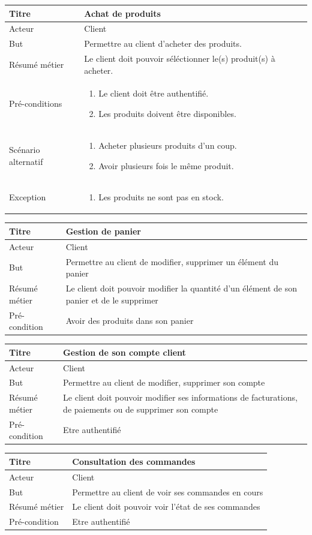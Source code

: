 \documentclass[12pt]{article}
\newcommand\addrow[2]{#1 &#2\\ }
\newcommand\addheading[2]{\textbf{#1} &#2\\ \hline}
\newcommand\tabularhead{\begin{tabular}{lp{11cm}}
\hline
}
\newcommand\addmulrow[2]{ \begin{minipage}[t][][t]{3.5cm}#1\end{minipage}%
    &\begin{minipage}[t][][t]{11cm}
    \begin{enumerate} #2   \end{enumerate}
    \end{minipage}\\ }
\newenvironment{usecase}{\tabularhead}
{\hline\end{tabular}}
\begin{document}
\begin{usecase}
    \addheading{Titre}{Achat de produits}
    \addrow{Acteur}{Client}
    \addrow{But}{Permettre au client d'acheter des produits.}
    \addrow{Résumé métier}{Le client doit pouvoir séléctionner le(s) produit(s) à acheter.}
    \addmulrow{Pré-conditions}{
    \item Le client doit être authentifié.
    \item Les produits doivent être disponibles.
    }
    \addmulrow{Scénario alternatif}{
    \item Acheter plusieurs produits d'un coup.
    \item Avoir plusieurs fois le même produit.
    }
    \addmulrow{Exception}{
    \item Les produits ne sont pas en stock.
    }
\end{usecase}

\begin{usecase}
    \addheading{Titre}{Gestion de panier}
    \addrow{Acteur}{Client}
    \addrow{But}{Permettre au client de modifier, supprimer un élément du panier}
    \addrow{Résumé métier}{Le client doit pouvoir modifier la quantité d'un élément de son panier et de le supprimer}
    \addrow{Pré-condition}{Avoir des produits dans son panier}
\end{usecase}

\begin{usecase}
    \addheading{Titre}{Gestion de son compte client}
    \addrow{Acteur}{Client}
    \addrow{But}{Permettre au client de modifier, supprimer son compte}
    \addrow{Résumé métier}{Le client doit pouvoir modifier ses informations de facturations, de paiements ou de supprimer son compte}
    \addrow{Pré-condition}{Etre authentifié}
\end{usecase}

\begin{usecase}
    \addheading{Titre}{Consultation des commandes}
    \addrow{Acteur}{Client}
    \addrow{But}{Permettre au client de voir ses commandes en cours}
    \addrow{Résumé métier}{Le client doit pouvoir voir l'état de ses commandes}
    \addrow{Pré-condition}{Etre authentifié}
\end{usecase}

\newpage
\end{document}
